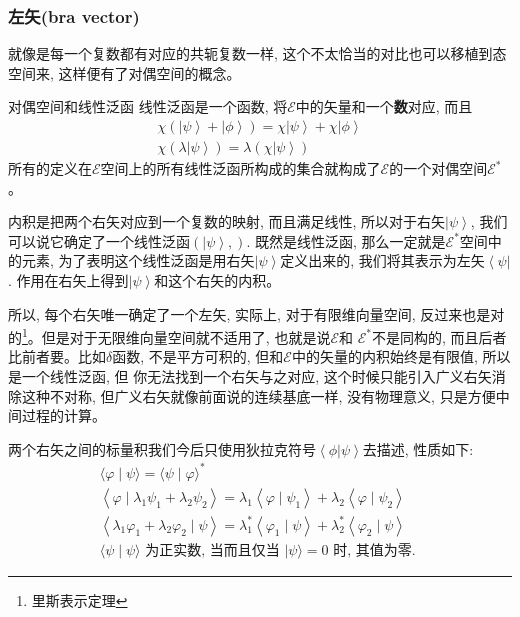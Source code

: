 \subsubsection*{左矢(bra vector)}
就像是每一个复数都有对应的共轭复数一样, 这个不太恰当的对比也可以移植到态空间来, 这样便有了对偶空间的概念。
\begin{define}{对偶空间和线性泛函}
    线性泛函是一个函数, 将$\mathscr{E}$中的矢量和一个\textbf{数}对应, 而且
    \[
    \begin{array}{l}
        \chi \left( {\left| \psi  \right\rangle  + \left| \phi  \right\rangle } \right) = \chi \left| \psi  \right\rangle  + \chi \left| \phi  \right\rangle \\
        \chi \left( {\lambda \left| \psi  \right\rangle } \right) = \lambda \left( {\chi \left| \psi  \right\rangle } \right)
    \end{array}\]
    所有的定义在$\mathscr{E}$空间上的所有线性泛函所构成的集合就构成了$\mathscr{E}$的一个对偶空间$\mathscr{E}^*$。
\end{define}
内积是把两个右矢对应到一个复数的映射, 而且满足线性, 所以对于右矢$\left| \psi  \right\rangle$, 我们可以说它确定了一个线性泛函$\left(\left| \psi  \right\rangle, \right)$.
既然是线性泛函, 那么一定就是$\mathscr{E}^*$空间中的元素, 为了表明这个线性泛函是用右矢$\left| \psi  \right\rangle$定义出来的, 我们将其表示为左矢$\left\langle \psi  \right|$.
作用在右矢上得到$\left| \psi  \right\rangle$和这个右矢的内积。

所以, 每个右矢唯一确定了一个左矢, 实际上, 对于有限维向量空间, 反过来也是对的\footnote[1]{里斯表示定理}。但是对于无限维向量空间就不适用了, 也就是说$\mathscr{E}$和
$\mathscr{E}^*$不是同构的, 而且后者比前者要。比如$\delta$函数, 不是平方可积的, 但和$\mathscr{E}$中的矢量的内积始终是有限值, 所以是一个线性泛函, 但
你无法找到一个右矢与之对应, 这个时候只能引入广义右矢消除这种不对称, 但广义右矢就像前面说的连续基底一样, 没有物理意义, 只是方便中间过程的计算。

两个右矢之间的标量积我们今后只使用狄拉克符号$\left\langle \phi | \psi \right\rangle$去描述, 性质如下:
\begin{equation}
    \boxed{
        \begin{array}{l}
            \langle\varphi \mid \psi\rangle=\langle\psi \mid \varphi\rangle^{*} \\
            \left\langle\varphi \mid \lambda_{1} \psi_{1}+\lambda_{2} \psi_{2}\right\rangle=\lambda_{1}\left\langle\varphi \mid \psi_{1}\right\rangle+\lambda_{2}\left\langle\varphi \mid \psi_{2}\right\rangle \\
            \left\langle\lambda_{1} \varphi_{1}+\lambda_{2} \varphi_{2} \mid \psi\right\rangle=\lambda_{1}^{*}\left\langle\varphi_{1} \mid \psi\right\rangle+\lambda_{2}^{*}\left\langle\varphi_{2} \mid \psi\right\rangle \\
            \langle\psi \mid \psi\rangle \text { 为正实数, 当而且仅当 }|\psi\rangle=0 \text { 时, 其值为零. }
        \end{array}
    }
\end{equation}

